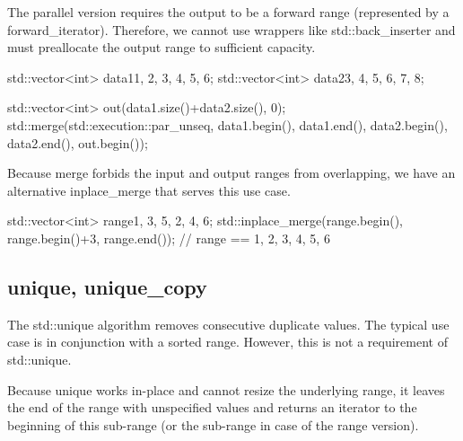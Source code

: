 The parallel version requires the output to be a forward range (represented by a forward\_iterator). Therefore, we cannot use wrappers like std::back\_inserter and must preallocate the output range to sufficient capacity.

\begin{box-note}
\begin{cppcode}
std::vector<int> data1{1, 2, 3, 4, 5, 6};
std::vector<int> data2{3, 4, 5, 6, 7, 8};

std::vector<int> out(data1.size()+data2.size(), 0);
std::merge(std::execution::par_unseq,
    data1.begin(), data1.end(),
    data2.begin(), data2.end(),
    out.begin());
\end{cppcode}
\end{box-note}



Because merge forbids the input and output ranges from overlapping, we have an alternative inplace\_merge that serves this use case.

\begin{box-note}
\begin{cppcode}
std::vector<int> range{1, 3, 5, 2, 4, 6};
std::inplace_merge(range.begin(), range.begin()+3, range.end());
// range == { 1, 2, 3, 4, 5, 6 }
\end{cppcode}
\end{box-note}

\subsection{unique, unique\_copy}

The std::unique algorithm removes consecutive duplicate values. The typical use case is in conjunction with a sorted range. However, this is not a requirement of std::unique.



Because unique works in-place and cannot resize the underlying range, it leaves the end of the range with unspecified values and returns an iterator to the beginning of this sub-range (or the sub-range in case of the range version).

